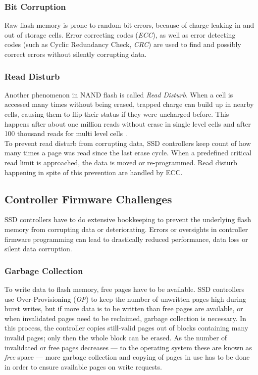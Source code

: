 \documentclass{acm_proc_article-sp}
\begin{document}
\subsubsection*{Bit Corruption}
Raw flash memory is prone to random bit errors, because of charge leaking in and out of storage cells. Error correcting codes (\emph{ECC}), as well as error detecting codes (such as Cyclic Redundancy Check, \emph{CRC}) are used to find and possibly correct errors without silently corrupting data.

\subsubsection*{Read Disturb}
Another phenomenon in NAND flash is called \emph{Read Disturb}. When a cell is accessed many times without being erased, trapped charge can build up in nearby cells, causing them to flip their status if they were uncharged before.
This happens after about one million reads without erase in single level cells and after 100 thousand reads for multi level cells \cite{cooke2007inconvenient}.
\\
To prevent read disturb from corrupting data, SSD controllers keep count of how many times a page was read since the last erase cycle. When a predefined critical read limit is approached, the data is moved or re-programmed. Read disturb happening in spite of this prevention are handled by ECC.

\subsection{Controller Firmware Challenges}
SSD controllers have to do extensive bookkeeping to prevent the underlying flash memory from corrupting data or deteriorating. Errors or oversights in controller firmware programming can lead to drastically reduced performance, data loss or silent data corruption.

\subsubsection*{Garbage Collection}
To write data to flash memory, free pages have to be available. SSD controllers use Over-Provisioning (\emph{OP}) to keep the number of unwritten pages high during burst writes, but if more data is to be written than free pages are available, or when invalidated pages need to be reclaimed, garbage collection is necessary. In this process, the controller copies still-valid pages out of blocks containing many invalid pages; only then the whole block can be erased. As the number of invalidated or free pages decreases --- to the operating system these are known as \emph{free} space --- more garbage collection and copying of pages in use has to be done in order to ensure available pages on write requests.
\end{document}
